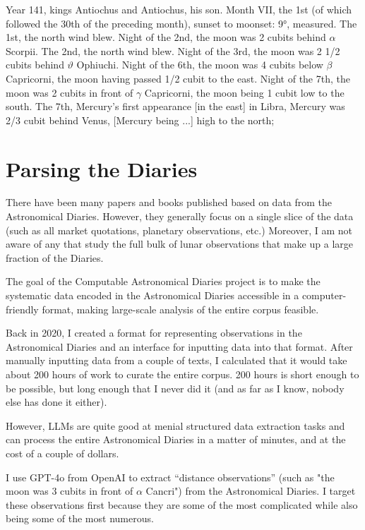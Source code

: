 \documentclass{article}
\begin{document}
\begin{displayquote}
Year 141, kings Antiochus and Antiochus, his son. Month VII, the 1st (of which followed the 30th of the preceding month), sunset to moonset: 9°, measured. The 1st, the north wind blew. Night of the 2nd, the moon was 2 cubits behind $\alpha$ Scorpii. The 2nd, the north wind blew. Night of the 3rd, the moon was 2 1/2 cubits behind $\vartheta$ Ophiuchi. Night of the 6th, the moon was 4 cubits below $\beta$ Capricorni, the moon having passed 1/2 cubit to the east. Night of the 7th, the moon was 2 cubits in front of $\gamma$ Capricorni, the moon being 1 cubit low to the south. The 7th, Mercury’s first appearance [in the east] in Libra, Mercury was 2/3 cubit behind Venus, [Mercury being ...] high to the north;
\end{displayquote}

\section{Parsing the Diaries}
There have been many papers and books published based on data from the Astronomical Diaries. However, they generally focus on a single slice of the data (such as all market quotations, planetary observations, etc.) Moreover, I am not aware of any that study the full bulk of lunar observations that make up a large fraction of the Diaries.

The goal of the Computable Astronomical Diaries project is to make the systematic data encoded in the Astronomical Diaries accessible in a computer-friendly format, making large-scale analysis of the entire corpus feasible.

Back in 2020, I created a format for representing observations in the Astronomical Diaries and an interface for inputting data into that format. After manually inputting data from a couple of texts, I calculated that it would take about 200 hours of work to curate the entire corpus. 200 hours is short enough to be possible, but long enough that I never did it (and as far as I know, nobody else has done it either).

However, LLMs are quite good at menial structured data extraction tasks and can process the entire Astronomical Diaries in a matter of minutes, and at the cost of a couple of dollars.

I use GPT-4o from OpenAI to extract ``distance observations'' (such as "the moon was 3 cubits in front of $\alpha$ Cancri") from the Astronomical Diaries. I target these observations first because they are some of the most complicated while also being some of the most numerous.
\end{document}
